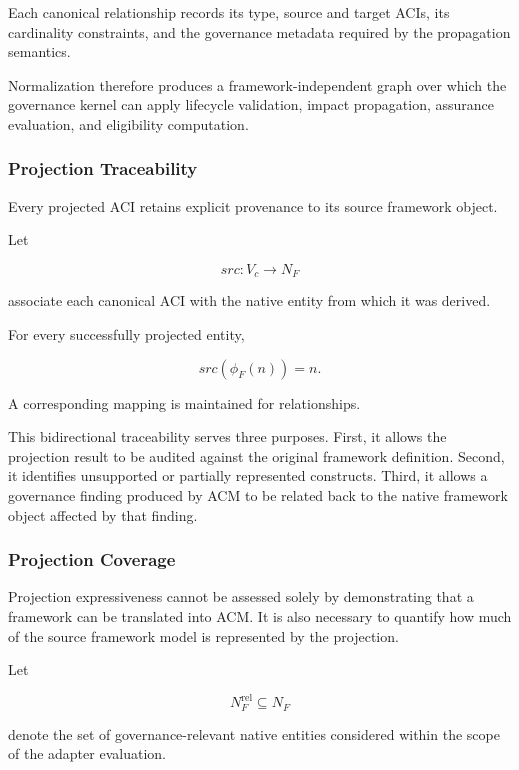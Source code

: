 \documentclass[10pt]{article}
\begin{document}
Each canonical relationship records its type, source and target ACIs, its
cardinality constraints, and the governance metadata required by the
propagation semantics.

Normalization therefore produces a framework-independent graph over which the
governance kernel can apply lifecycle validation, impact propagation, assurance
evaluation, and eligibility computation.

\subsubsection{Projection Traceability}

Every projected ACI retains explicit provenance to its source framework object.

Let

\[
src :
V_c
\rightarrow
N_F
\tag{44}
\]

associate each canonical ACI with the native entity from which it was derived.

For every successfully projected entity,

\[
src(\phi_F(n))=n.
\tag{45}
\]

A corresponding mapping is maintained for relationships.

This bidirectional traceability serves three purposes. First, it allows the
projection result to be audited against the original framework definition.
Second, it identifies unsupported or partially represented constructs. Third,
it allows a governance finding produced by ACM to be related back to the native
framework object affected by that finding.

\subsubsection{Projection Coverage}

Projection expressiveness cannot be assessed solely by demonstrating that a
framework can be translated into ACM. It is also necessary to quantify how much
of the source framework model is represented by the projection.

Let

\[
N_F^{\mathrm{rel}}
\subseteq
N_F
\]

denote the set of governance-relevant native entities considered within the
scope of the adapter evaluation.
\end{document}
